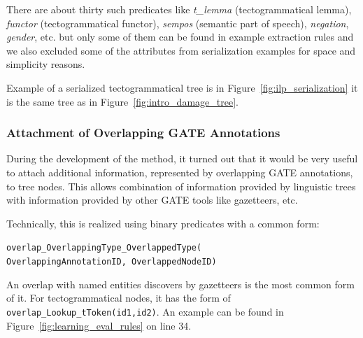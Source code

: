 \noindent There are about thirty such predicates like \emph{t\_lemma} (tectogrammatical lemma), \emph{functor} (tectogrammatical functor), \emph{sempos} (semantic part of speech), \emph{negation}, \emph{gender}, etc. but only some of them can be found in example extraction rules and we also excluded some of the attributes from serialization examples for space and simplicity reasons.

Example of a serialized tectogrammatical tree is in Figure~\ref{fig:ilp_serialization} it is the same tree as in Figure~\ref{fig:intro_damage_tree}.

\subsubsection{Attachment of Overlapping GATE Annotations}
During the development of the method, it turned out that it would be very useful to attach additional information, represented by overlapping GATE annotations, to tree nodes. This allows combination of information provided by linguistic trees with information provided by other GATE tools like gazetteers, etc. 

Technically, this is realized using binary predicates with a common form:

\texttt{overlap\_OverlappingType\_OverlappedType(}
\\ \phantom{a} \hfill{} \phantom{b} \texttt{OverlappingAnnotationID, OverlappedNodeID)}

\noindent An overlap with named entities discovers by gazetteers is the most common form of it. For tectogrammatical nodes, it has the form of \texttt{overlap\_Lookup\_tToken(id1,id2)}. An example can be found in Figure~\ref{fig:learning_eval_rules} on line 34. 


